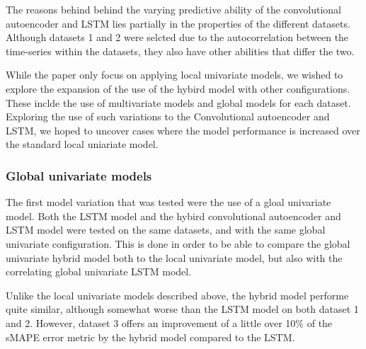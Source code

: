 The reasons behind behind the varying predictive ability of the convolutional autoencoder and LSTM lies partially
in the properties of the different datasets.
Although datasets 1 and 2 were selcted due to the autocorrelation between the time-series within the datasets,
they also have other abilities that differ the two.




  



While the paper \cite{Zhao2019} only focus on applying local univariate models,
we wished to explore the expansion of the use of the hybird model with other configurations.
These inclde the use of multivariate models and global models for each dataset.
Exploring the use of such variations to the Convolutional autoencoder and LSTM,
we hoped to uncover cases where the model performance is increased over the standard local uniariate model.



\subsubsection{Global univariate models}
The first model variation that was tested were the use of a gloal univariate model.
Both the LSTM model and the hybird convolutional autoencoder and LSTM model were tested on the same datasets,
and with the same global univariate configuration.
This is done in order to be able to compare the global univariate hybrid model both to the local univariate model,
but also with the correlating global univariate LSTM model.

Unlike the local univariate models described above, the hybrid model performe quite similar, although somewhat worse than the LSTM model
on both dataset 1 and 2.
However, dataset 3 offers an improvement of a little over 10\% of the sMAPE error metric by the hybrid model compared to the LSTM.

